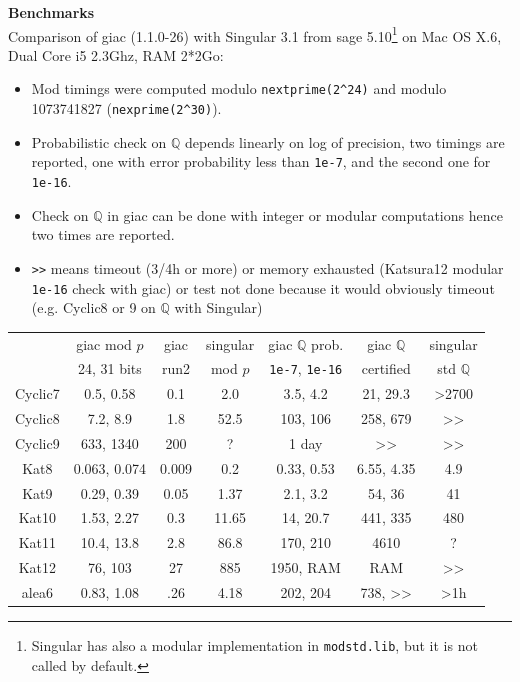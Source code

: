 \documentclass[a4paper,11pt]{book}
\begin{document}
\begin{giacjshere}
{\bf Benchmarks}\\
Comparison of giac (1.1.0-26) with Singular 3.1 from sage
5.10\footnote{Singular has also a modular implementation in
  {\tt modstd.lib}, but it is not called by default.}
on Mac OS X.6, Dual Core i5 2.3Ghz, RAM 2*2Go:
\begin{itemize}
\item Mod timings were computed modulo \verb|nextprime(2^24)|
and modulo 1073741827 (\verb|nexprime(2^30)|).
\item Probabilistic check on $\mathbb{Q}$ depends linearly on log of precision, two
timings are reported, one with error probability less than \verb|1e-7|, and
the second one for \verb|1e-16|.
\item Check on $\mathbb{Q}$ in giac can be done with integer or modular computations
hence two times are reported.
\item \verb|>>| means timeout (3/4h or more) or memory exhausted
(Katsura12 modular \verb|1e-16| check with giac) or test not done because
it would obviously timeout (e.g. Cyclic8 or 9 on $\mathbb{Q}$ with Singular)
\end{itemize}
\begin{tabular}{|c|c|c|c||c|c|c|} \hline
        & giac mod $p$ & giac & singular & giac $\mathbb{Q}$ prob. & giac $\mathbb{Q}$  & singular \\ 
        & 24, 31 bits & run2 & mod $p$ & \verb|1e-7|, \verb|1e-16| &
                                                                     certified & std $\mathbb{Q}$ \\ \hline
Cyclic7 & 0.5, 0.58 & 0.1&2.0 & 3.5, 4.2 & 21, 29.3 & >2700 \\
Cyclic8 & 7.2, 8.9 & 1.8 &52.5 & 103, 106 & 258, 679 & >> \\
Cyclic9 & 633, 1340 & 200 & ? & 1 day & >> & >> \\ \hline
Kat8 & 0.063, 0.074 & 0.009& 0.2 & 0.33, 0.53 & 6.55, 4.35 & 4.9\\
Kat9 & 0.29, 0.39 & 0.05 &1.37 & 2.1, 3.2 & 54, 36& 41\\
Kat10 & 1.53, 2.27 & 0.3& 11.65 & 14, 20.7 & 441, 335 &  480 \\
Kat11 & 10.4, 13.8 & 2.8 & 86.8 & 170, 210& 4610 & ? \\
Kat12 & 76, 103 & 27 & 885 & 1950, RAM & RAM & >> \\ \hline
alea6 & 0.83, 1.08& .26 & 4.18 & 202, 204& 738, >> & >1h\\

\end{tabular}
\end{giacjshere}
\end{document}
